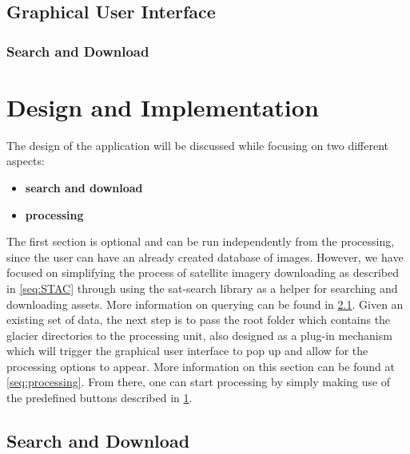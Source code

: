 \documentclass[12pt, a4paper]{report}
\begin{document}
	\newpage{}
	\section{Graphical User Interface}
	\label{seq:gui}
	
	\subsection{Search and Download}
	\label{seq:search_download}

	\newpage{}
	\chapter{Design and Implementation}
	\label{cha:design_and_implementation}
	
	\par The design of the application will be discussed while focusing on two different aspects:
	
	\begin{itemize}
		\item \textbf{search and download}
		\item \textbf{processing}
	\end{itemize}

	\par The first section is optional and can be run independently from the processing, since the user can have an already created database of images. However, we have focused on simplifying the process of satellite imagery downloading as described in \ref{seq:STAC} through using the sat-search library as a helper for searching and downloading assets. More information on querying can be found in \ref{seq:sd_implementation}. 
	Given an existing set of data, the next step is to pass the root folder which contains the glacier directories to the processing unit, also designed as a plug-in mechanism which will trigger the graphical user interface to pop up and allow for the processing options to appear. More information on this section can be found at \ref{seq:processing}. From there, one can start processing by simply making use of the predefined buttons described in \ref{seq:gui}.
	
		
	\section{Search and Download}
	\label{seq:sd_implementation}
		
\end{document}
